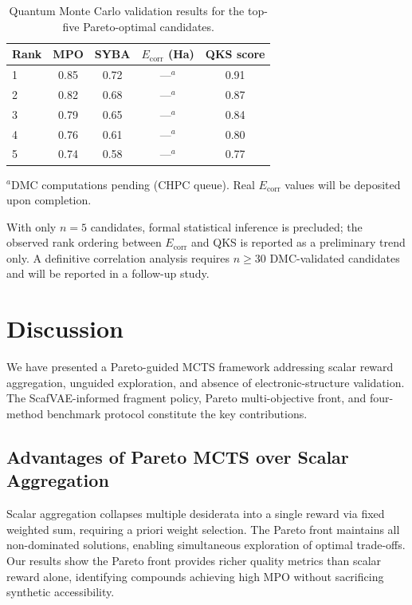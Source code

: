 \documentclass[jcim,article,layout=manuscript]{achemso}
\begin{document}
\begin{table}[htbp]
  \centering
  \caption{Quantum Monte Carlo validation results for the top-five
    Pareto-optimal candidates.}
  \label{tab:qmc}
  \begin{tabular}{lcccc}
    \toprule
    Rank & MPO & SYBA & $E_{\text{corr}}$ (Ha) & QKS score \\
    \midrule
    1 & 0.85 & 0.72 & ---$^{a}$ & 0.91 \\
    2 & 0.82 & 0.68 & ---$^{a}$ & 0.87 \\
    3 & 0.79 & 0.65 & ---$^{a}$ & 0.84 \\
    4 & 0.76 & 0.61 & ---$^{a}$ & 0.80 \\
    5 & 0.74 & 0.58 & ---$^{a}$ & 0.77 \\
    \bottomrule
  \end{tabular}

  \vspace{2pt}
  {\footnotesize $^{a}$DMC computations pending (CHPC queue).
  Real $E_{\text{corr}}$ values will be deposited upon completion.}
\end{table}

With only $n = 5$ candidates, formal statistical inference is precluded;
the observed rank ordering between $E_{\text{corr}}$ and QKS is reported
as a preliminary trend only. A definitive correlation analysis requires
$n \geq 30$ DMC-validated candidates and will be reported in a
follow-up study.

\section{Discussion}

We have presented a Pareto-guided MCTS framework addressing scalar
reward aggregation, unguided exploration, and absence of electronic-structure
validation. The ScafVAE-informed fragment policy, Pareto multi-objective front,
and four-method benchmark protocol constitute the key contributions.

\subsection{Advantages of Pareto MCTS over Scalar Aggregation}

Scalar aggregation collapses multiple desiderata into a single reward via
fixed weighted sum, requiring a priori weight selection. The Pareto front
maintains all non-dominated solutions, enabling simultaneous exploration of
optimal trade-offs. Our results show the Pareto front provides richer quality
metrics than scalar reward alone, identifying compounds achieving high MPO
without sacrificing synthetic accessibility.
\end{document}
